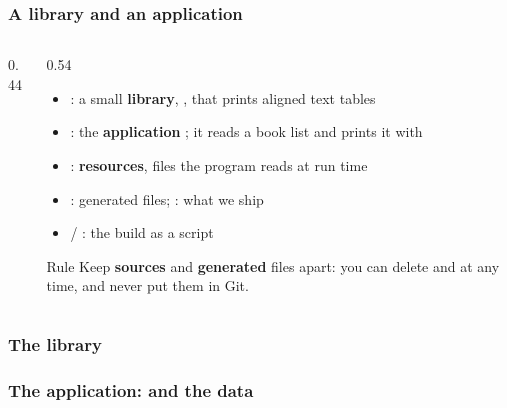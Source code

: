 \documentclass[aspectratio=169,10pt,compress]{beamer}
\begin{document}
\begin{frame}[t,fragile] \frametitle{A library and an application}
  \begin{columns}[T]
    \begin{column}{0.44\textwidth}
    \end{column}
    \begin{column}{0.54\textwidth}
      \begin{itemize}\small
        \item {}: a small \textbf{library}, , that prints aligned text tables
        \item {}: the \textbf{application} ; it reads a book list and prints it with 
        \item {}: \textbf{resources}, files the program reads at run time
        \item {}: generated  files; : what we ship
        \item {} / : the build as a script
      \end{itemize}
      \begin{block}{Rule}
        \small Keep \textbf{sources} and \textbf{generated} files apart: you can delete  and  at any time,
        and never put them in Git.
      \end{block}
    \end{column}
  \end{columns}
\end{frame}




\begin{frame}[t,fragile] \frametitle{The library}
\end{frame}




\begin{frame}[t,fragile] \frametitle{The application:  and the data}
\end{frame}
\end{document}
